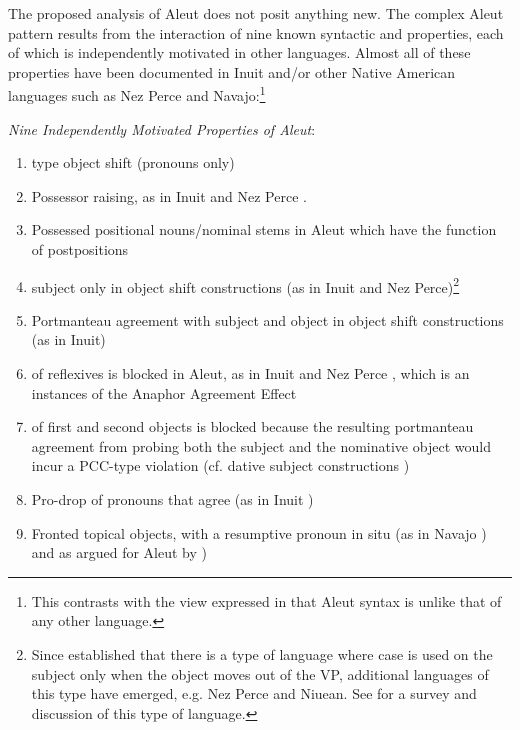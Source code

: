 \documentclass[output=paper]{LSP/langsci}
\begin{document}
The proposed analysis of Aleut does not posit anything new. The complex Aleut pattern results from the interaction of nine known syntactic and  properties, each of which is independently motivated in other languages. Almost all of these properties have been documented in Inuit and/or other Native American languages such as Nez Perce and Navajo:\footnote{This contrasts with the view expressed in \citealt{boyle2000aleut} that Aleut syntax is unlike that of any other language.}

\ea\label{ex:woolford:6}
\textit{Nine Independently Motivated Properties of Aleut}:

\begin{enumerate}
\item
{} type object shift (pronouns only)
\item
Possessor raising, as in Inuit  \citep[71]{bittner1994case} and Nez Perce \citep{deal2010ergative}.
\item
Possessed positional nouns/nominal stems in Aleut which have the function of postpositions \citep{fortescue1985anaphoric,bergsland1997aleut}
\item
{} subject only in object shift constructions (as in Inuit and Nez Perce)\footnote{Since \citet{bittner1996ergativity} established that there is a type of  language where  case is used on the subject only when the object moves out of the VP, additional languages of this type have emerged, e.g. Nez Perce and Niuean. See \citet{woolford2015ergativity} for a survey and discussion of this type of  language. }
\item
Portmanteau agreement with subject and object in object shift constructions (as in Inuit)
\item
{} of reflexives is blocked in Aleut, as in Inuit \citep[82]{bittner1994case} and Nez Perce \citep{deal2010ergative}, which is an instances of the Anaphor Agreement Effect \citep{rizzi1990anaphor,woolford1999more}
\item
{} of first and second  objects is blocked because the resulting portmanteau agreement from probing both the  subject and the nominative object would incur a PCC-type violation (cf.  dative subject constructions \citep{Sigurðsson1996})
\item
Pro-drop of pronouns that agree (as in Inuit \citep{bok1983on,bok1991case})
\item
Fronted topical objects, with a resumptive pronoun in situ (as in Navajo \citealt{Speas1990,Willie1991}) and as argued for Aleut by \citet{boyle2000aleut})
\end{enumerate}
\z
\end{document}
